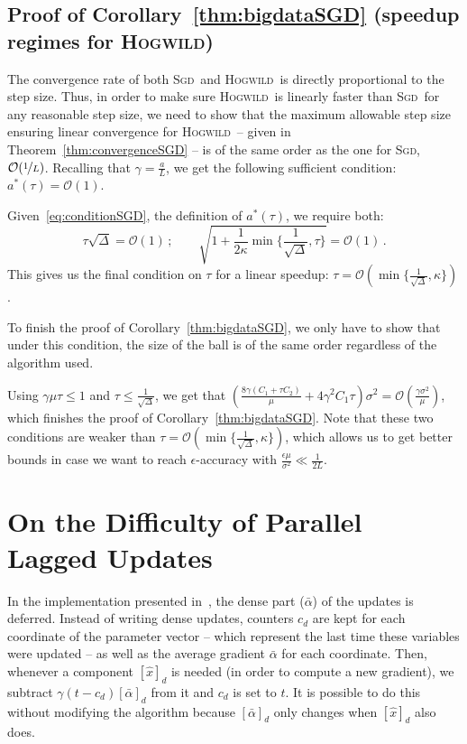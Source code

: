 \documentclass[twoside, 11pt]{article}
\newcommand{\stepsize}{\gamma}
\newcommand{\strongconvex}{\mu}
\newcommand{\overlap}{\tau}
\newcommand{\sparsity}{\Delta}
\newcommand{\lipschitz}{L}
\newcommand{\Hogwild}{\textsc{Hogwild}}
\newcommand{\SGD}{\textsc{Sgd}}
\begin{document}
\subsection{Proof of Corollary~\ref{thm:bigdataSGD} (speedup regimes for \Hogwild)}\label{apx:SGDcorollary}
The convergence rate of both \SGD\ and \Hogwild\ is directly proportional to the step size.
Thus, in order to make sure \Hogwild\ is linearly faster than \SGD\ for any reasonable step size, we need to show that the maximum allowable step size ensuring linear convergence for \Hogwild\ -- given in Theorem~\ref{thm:convergenceSGD} -- is of the same order as the one for \SGD, $\mathcal{O}(\nicefrac{1}{\lipschitz})$.
Recalling that $\stepsize = \frac{a}{\lipschitz}$, we get the following sufficient condition: $a^*(\overlap) = \mathcal{O}(1)$.

Given~\eqref{eq:conditionSGD}, the definition of $a^*(\overlap)$, we require both:
\begin{equation}
\overlap \sqrt{\sparsity} = \mathcal{O}(1) \, ; \qquad\sqrt{1 + \frac{1}{2 \kappa}  \min\{\frac{1}{\sqrt{\sparsity}}, \overlap\} } = \mathcal{O}(1)\,.
\end{equation}
This gives us the final condition on $\overlap$ for a linear speedup: $\overlap = \mathcal{O}({\min\{\frac{1}{\sqrt{\sparsity}}}, \kappa\})$.

To finish the proof of Corollary~\ref{thm:bigdataSGD}, we only have to show that under this condition, the size of the ball is of the same order regardless of the algorithm used.

Using $\stepsize \strongconvex \overlap \leq 1$ and $\overlap \leq \frac{1}{\sqrt{\sparsity}}$, we get that $(\frac{8 \stepsize (C_1 + \overlap C_2)}{\strongconvex} + 4 \stepsize^2 C_1 \overlap) \sigma^2 = \mathcal{O}( \frac{\stepsize \sigma^2}{\strongconvex})$, which finishes the proof of Corollary~\ref{thm:bigdataSGD}.
Note that these two conditions are weaker than $\overlap = \mathcal{O}({\min\{\frac{1}{\sqrt{\sparsity}}}, \kappa\})$, which allows us to get better bounds in case we want to reach $\epsilon$-accuracy with $\frac{\epsilon \strongconvex}{\sigma^2} \ll \frac{1}{2\lipschitz}$.
\hfill\BlackBox



\section{On the Difficulty of Parallel Lagged Updates}\label{apxC}\label{apx:DifficultyLagged}
In the implementation presented in~\citet{laggedsaga}, the dense part ($\bar \alpha$) of the updates is deferred.
Instead of writing dense updates, counters $c_d$ are kept for each coordinate of the parameter vector -- which represent the last time these variables were updated -- as well as the average gradient $\bar \alpha$ for each coordinate.
Then, whenever a component $[\hat x]_d$ is needed (in order to compute a new gradient), we subtract $\stepsize (t-c_d) [\bar \alpha]_d$ from it and $c_d$ is set to $t$.
It is possible to do this without modifying the algorithm because  $[\bar \alpha]_d$ only changes when $[\hat x]_d$ also does.
\end{document}
